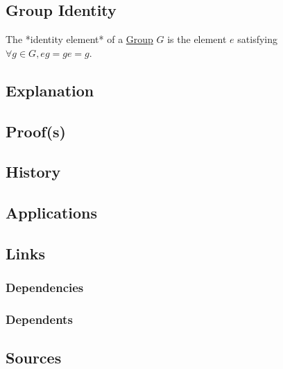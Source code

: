 \subsection{Group Identity}\label{articles:algebra:group-theory:group-identity}
The *identity element* of a \hyperref[articles:algebra:group-theory:group]{Group} $G$ is the element $e$ satisfying $\forall g \in G, eg = ge = g$.

\subsection{Explanation}

\subsection{Proof(s)}

\subsection{History}

\subsection{Applications}

\subsection{Links}
\subsubsection{Dependencies}
\subsubsection{Dependents}

\subsection{Sources}
